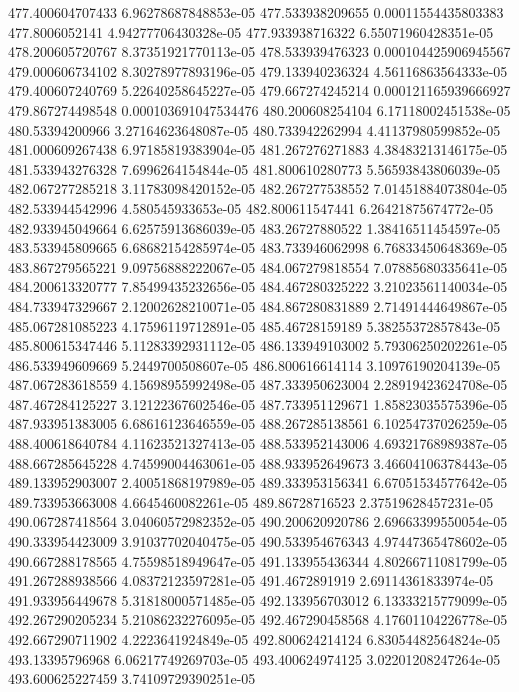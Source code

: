 {477.400604707433 6.96278687848853e-05
477.533938209655 0.00011554435803383
477.8006052141 4.94277706430328e-05
477.933938716322 6.55071960428351e-05
478.200605720767 8.37351921770113e-05
478.533939476323 0.000104425906945567
479.000606734102 8.30278977893196e-05
479.133940236324 4.56116863564333e-05
479.400607240769 5.22640258645227e-05
479.667274245214 0.000121165939666927
479.867274498548 0.000103691047534476
480.200608254104 6.17118002451538e-05
480.53394200966 3.27164623648087e-05
480.733942262994 4.41137980599852e-05
481.000609267438 6.97185819383904e-05
481.267276271883 4.38483213146175e-05
481.533943276328 7.6996264154844e-05
481.800610280773 5.56593843806039e-05
482.067277285218 3.11783098420152e-05
482.267277538552 7.01451884073804e-05
482.533944542996 4.580545933653e-05
482.800611547441 6.26421875674772e-05
482.933945049664 6.62575913686039e-05
483.26727880522 1.38416511454597e-05
483.533945809665 6.68682154285974e-05
483.733946062998 6.76833450648369e-05
483.867279565221 9.09756888222067e-05
484.067279818554 7.07885680335641e-05
484.200613320777 7.85499435232656e-05
484.467280325222 3.21023561140034e-05
484.733947329667 2.12002628210071e-05
484.867280831889 2.71491444649867e-05
485.067281085223 4.17596119712891e-05
485.46728159189 5.38255372857843e-05
485.800615347446 5.11283392931112e-05
486.133949103002 5.79306250202261e-05
486.533949609669 5.2449700508607e-05
486.800616614114 3.10976190204139e-05
487.067283618559 4.15698955992498e-05
487.333950623004 2.28919423624708e-05
487.467284125227 3.12122367602546e-05
487.733951129671 1.85823035575396e-05
487.933951383005 6.68616123646559e-05
488.267285138561 6.10254737026259e-05
488.400618640784 4.11623521327413e-05
488.533952143006 4.69321768989387e-05
488.667285645228 4.74599004463061e-05
488.933952649673 3.46604106378443e-05
489.133952903007 2.40051868197989e-05
489.333953156341 6.67051534577642e-05
489.733953663008 4.6645460082261e-05
489.86728716523 2.37519628457231e-05
490.067287418564 3.04060572982352e-05
490.200620920786 2.69663399550054e-05
490.333954423009 3.91037702040475e-05
490.533954676343 4.97447365478602e-05
490.667288178565 4.75598518949647e-05
491.133955436344 4.80266711081799e-05
491.267288938566 4.08372123597281e-05
491.4672891919 2.69114361833974e-05
491.933956449678 5.31818000571485e-05
492.133956703012 6.13333215779099e-05
492.267290205234 5.21086232276095e-05
492.467290458568 4.17601104226778e-05
492.667290711902 4.2223641924849e-05
492.800624214124 6.83054482564824e-05
493.13395796968 6.06217749269703e-05
493.400624974125 3.02201208247264e-05
493.600625227459 3.74109729390251e-05
}
